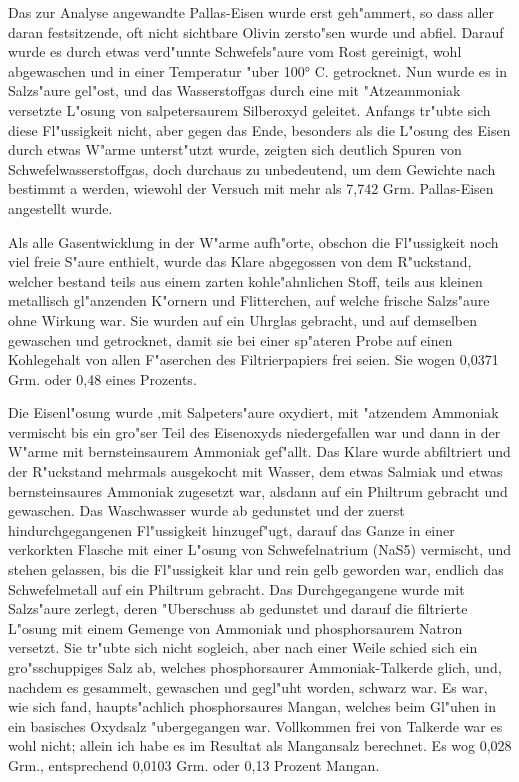 \documentclass[a4paper, 11pt, oneside]{article}
\begin{document}
Das zur Analyse angewandte Pallas-Eisen wurde erst geh"ammert, so dass aller daran festsitzende, oft nicht sichtbare Olivin zersto"sen wurde und abfiel. Darauf wurde es durch etwas verd"unnte Schwefels"aure vom Rost gereinigt, wohl abgewaschen und in einer Temperatur "uber 100° C. getrocknet. Nun wurde es in Salzs"aure gel"ost, und das Wasserstoffgas durch eine mit "Atzeammoniak versetzte L"osung von salpetersaurem Silberoxyd geleitet. Anfangs tr"ubte sich diese Fl"ussigkeit nicht, aber gegen das Ende, besonders als die L"osung des Eisen durch etwas W"arme unterst"utzt wurde, zeigten sich deutlich Spuren von Schwefelwasserstoffgas, doch durchaus zu unbedeutend, um dem Gewichte nach bestimmt a werden, wiewohl der Versuch mit mehr als 7,742 Grm. Pallas-Eisen angestellt wurde.

Als alle Gasentwicklung in der W"arme aufh"orte, obschon die Fl"ussigkeit noch viel freie S"aure enthielt, wurde das Klare abgegossen von dem R"uckstand, welcher bestand teils aus einem zarten kohle"ahnlichen Stoff, teils aus kleinen metallisch gl"anzenden K"ornern und Flitterchen, auf welche frische Salzs"aure ohne Wirkung war. Sie wurden auf ein Uhrglas gebracht, und auf demselben gewaschen und getrocknet, damit sie bei einer sp"ateren Probe auf einen Kohlegehalt von allen F"aserchen des Filtrierpapiers frei seien. Sie wogen 0,0371 Grm. oder 0,48 eines Prozents.

Die Eisenl"osung wurde ‚mit Salpeters"aure oxydiert, mit "atzendem Ammoniak vermischt bis ein gro"ser Teil des Eisenoxyds niedergefallen war und dann in der W"arme mit bernsteinsaurem Ammoniak gef"allt. Das Klare wurde abfiltriert und der R"uckstand mehrmals ausgekocht mit Wasser, dem etwas Salmiak und etwas bernsteinsaures Ammoniak zugesetzt war, alsdann auf ein Philtrum gebracht und gewaschen. Das Waschwasser wurde ab gedunstet und der zuerst hindurchgegangenen Fl"ussigkeit hinzugef"ugt, darauf das Ganze in einer verkorkten Flasche mit einer L"osung von Schwefelnatrium (NaS5) vermischt, und stehen gelassen, bis die Fl"ussigkeit klar und rein gelb geworden war, endlich das Schwefelmetall auf ein Philtrum gebracht. Das Durchgegangene wurde mit Salzs"aure zerlegt, deren "Uberschuss ab gedunstet und darauf die filtrierte L"osung mit einem Gemenge von Ammoniak und phosphorsaurem Natron versetzt. Sie tr"ubte sich nicht sogleich, aber nach einer Weile schied sich ein gro"sschuppiges Salz ab, welches phosphorsaurer Ammoniak-Talkerde glich, und, nachdem es gesammelt, gewaschen und gegl"uht worden, schwarz war. Es war, wie sich fand, haupts"achlich phosphorsaures Mangan, welches beim Gl"uhen in ein basisches Oxydsalz "ubergegangen war. Vollkommen frei von Talkerde war es wohl nicht; allein ich habe es im Resultat als Mangansalz berechnet. Es wog 0,028 Grm., entsprechend 0,0103 Grm. oder 0,13 Prozent Mangan.
\end{document}
